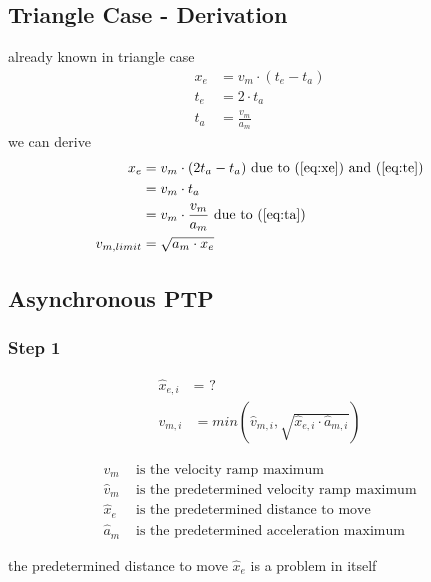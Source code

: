 \documentclass[%
  professionalfonts,%
  xcolor={%
    usenames,%
    dvipsnames,%
    svgnames,%
    table,%
    hyperref%
  }%
]{beamer}
\begin{document}
\subsection{Triangle Case - Derivation}
\begin{frame}
already known in triangle case
\begin{align}
x_{e} & = v_{m} \cdot (t_{e} - t_{a}) \label{eq:xe} \\
t_{e} & = 2 \cdot t_{a} \label{eq:te} \\
t_{a} & = \frac{v_{m}}{a_{m}} \label{eq:ta}
\end{align}
we can derive
\begin{align*}
x_{e} & = v_{m} \cdot (2 t_{a} - t_{a}) \text{ due to } (\ref{eq:xe}) \text{ and } (\ref{eq:te}) \\
& = v_{m} \cdot t_{a} \\
& = v_{m} \cdot \frac{v_{m}}{a_{m}}\text{ due to } (\ref{eq:ta}) \\
v_{m,limit} & = \sqrt{a_{m} \cdot x_{e}}
\end{align*}

\end{frame}

\subsection{Asynchronous PTP}

\subsubsection{Step 1}
\begin{frame}

\begin{align*}
\hat{x}_{e,i} & = \text{ ?} \\
v_{m,i } & = min(\hat{v}_{m,i},\sqrt{\hat{x}_{e,i} \cdot \hat{a}_{m,i}})  \label{eq:asynvmi}
\end{align*}

\begin{align*}
v_{m} & \text{ is the velocity ramp maximum} \\
\hat{v}_{m} & \text{ is the predetermined velocity ramp maximum} \\
\hat{x}_{e} & \text{ is the predetermined distance to move} \\
\hat{a}_{m} & \text{ is the predetermined acceleration maximum} 
\end{align*}

the predetermined distance to move $\hat{x}_{e}$ is a problem in itself
\end{frame}
\end{document}
